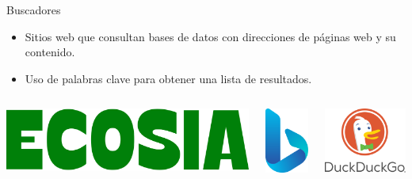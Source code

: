 \documentclass[
11pt, %
]{beamer}
\begin{document}
\begin{frame}{Buscadores}
	\begin{itemize}
		\item Sitios web que consultan bases de datos con direcciones de páginas web y su
		      contenido.
		\item Uso de palabras clave para obtener una lista de resultados.
	\end{itemize}

	\vspace{0.5cm} %

	\begin{columns}[T] %
		\centering
		\includegraphics[width=0.8\linewidth]{images/ecosia_icon}

		\centering
		\includegraphics[width=0.4\linewidth]{images/bing_icon}

		\centering
		\includegraphics[width=0.8\linewidth]{images/duckduckgo_icon}


\end{columns}
\end{frame}
\end{document}
